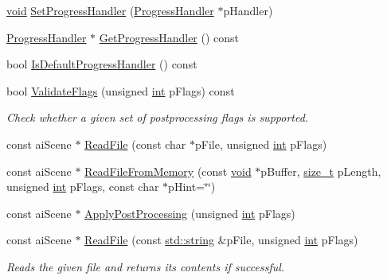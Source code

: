 \begin{DoxyCompactItemize}
\item 
\hyperlink{_s_d_l__opengl_8h_a3db05964a3cc4410f35b7ea2b7eb850d}{void} \hyperlink{class_assimp_1_1_importer_a6a4d830ffb3f77a3c7c919e0af006920}{Set\-Progress\-Handler} (\hyperlink{class_assimp_1_1_progress_handler}{Progress\-Handler} $\ast$p\-Handler)
\item 
\hyperlink{class_assimp_1_1_progress_handler}{Progress\-Handler} $\ast$ \hyperlink{class_assimp_1_1_importer_a1fa669f0edc504fdf9178e8e22c728ad}{Get\-Progress\-Handler} () const 
\item 
bool \hyperlink{class_assimp_1_1_importer_a2d60d970eddf8f9d35b6e9b54214cedd}{Is\-Default\-Progress\-Handler} () const 
\item 
bool \hyperlink{class_assimp_1_1_importer_a780329e2dd0406e930291cf8ab9deb99}{Validate\-Flags} (unsigned \hyperlink{_s_d_l__thread_8h_a6a64f9be4433e4de6e2f2f548cf3c08e}{int} p\-Flags) const 
\begin{DoxyCompactList}\small\item\em Check whether a given set of postprocessing flags is supported. \end{DoxyCompactList}\item 
const ai\-Scene $\ast$ \hyperlink{class_assimp_1_1_importer_a174418ab41d5b8bc51a044895cb991e5}{Read\-File} (const char $\ast$p\-File, unsigned \hyperlink{_s_d_l__thread_8h_a6a64f9be4433e4de6e2f2f548cf3c08e}{int} p\-Flags)
\item 
const ai\-Scene $\ast$ \hyperlink{class_assimp_1_1_importer_a9b3c5e8b1042702f449e84a95b3324f6}{Read\-File\-From\-Memory} (const \hyperlink{_s_d_l__opengl_8h_a3db05964a3cc4410f35b7ea2b7eb850d}{void} $\ast$p\-Buffer, \hyperlink{_s_d_l__config_8h_a7c94ea6f8948649f8d181ae55911eeaf}{size\-\_\-t} p\-Length, unsigned \hyperlink{_s_d_l__thread_8h_a6a64f9be4433e4de6e2f2f548cf3c08e}{int} p\-Flags, const char $\ast$p\-Hint=\char`\"{}\char`\"{})
\item 
const ai\-Scene $\ast$ \hyperlink{class_assimp_1_1_importer_a5872e749c1451fee64183fc14f1fc81d}{Apply\-Post\-Processing} (unsigned \hyperlink{_s_d_l__thread_8h_a6a64f9be4433e4de6e2f2f548cf3c08e}{int} p\-Flags)
\item 
const ai\-Scene $\ast$ \hyperlink{class_assimp_1_1_importer_a339882c7acb47d5b5110bbd078d870a9}{Read\-File} (const \hyperlink{_s_d_l__opengl_8h_a4643b88e2349494c65861169f8944eca}{std\-::string} \&p\-File, unsigned \hyperlink{_s_d_l__thread_8h_a6a64f9be4433e4de6e2f2f548cf3c08e}{int} p\-Flags)
\begin{DoxyCompactList}\small\item\em Reads the given file and returns its contents if successful. \end{DoxyCompactList}\item 

\end{DoxyCompactItemize}
